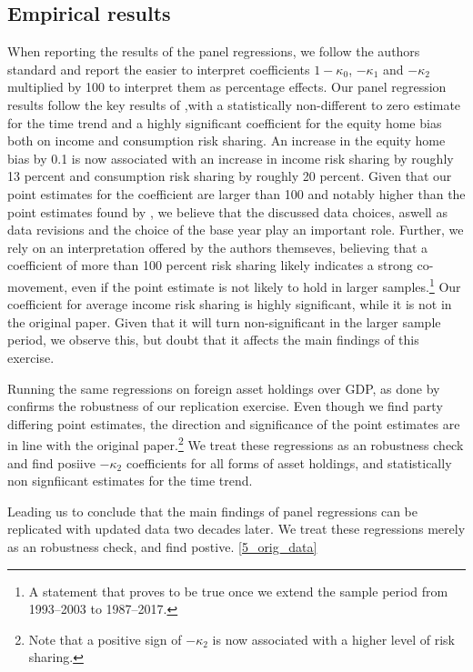 \documentclass[12pt,a4paper]{article}
\begin{document}
\subsection{Empirical results}
When reporting the results of the panel regressions, we follow
the authors standard and report the easier to interpret 
coefficients \(1-\kappa_0\), \(-\kappa_1\) and \(-\kappa_2\) multiplied
by 100 to interpret them as percentage effects. Our panel regression results follow the key results of 
\textcite{main},with a statistically 
non-different to zero estimate for the time trend and a highly significant coefficient
for the equity home bias both on income and consumption risk sharing. An increase in the equity home bias by 0.1 
is now associated with an increase in income risk sharing by roughly 13 percent and consumption risk sharing by 
roughly 20 percent. Given that our point estimates for the coefficient are larger than 100 and 
notably higher than the point estimates found by \textcite{main}, we believe that the discussed data choices, aswell as data revisions and the choice of the 
base year play an important role. Further, we rely on an interpretation
offered by the authors themseves, believing that a coefficient of more than 100 percent risk sharing likely indicates a strong co-movement, even if the point estimate is not likely to 
hold in larger samples.\footnote{A statement that proves to be true once we extend the sample period from 1993--2003 to 1987--2017.} Our coefficient for average income risk sharing
is highly significant, while it is not in the original paper. Given that it will turn non-significant in the larger sample period, we observe this, but doubt that it affects the main 
findings of this exercise. 



Running the same regressions on foreign asset holdings over GDP, as done by \textcite{main} confirms the robustness of our replication exercise. Even 
though we find party differing point estimates, the direction and significance of the point estimates are in line with the original paper.\footnote{Note that a positive 
sign of \(-\kappa_2\) is now associated with a higher level of risk sharing.}  We treat these regressions as an robustness check and find posiive \(-\kappa_2\) coefficients 
for all forms of asset holdings, and statistically non signfiicant estimates for the time trend.

Leading us to conclude that the main findings of \textcite{main} panel regressions can be replicated with updated data two decades later.
We treat these regressions merely as an robustness check, and find postive. \ref{5_orig_data}
\end{document}
